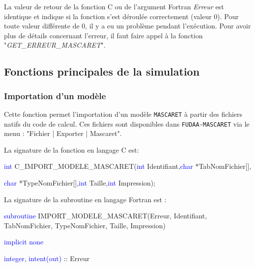 \documentclass[a4paper,11pt]{article}
\begin{document}
 \vspace{0.5cm}
 
 La valeur de retour de la fonction C ou de l'argument Fortran \textit{Erreur} est identique et indique si la fonction s'est d\'eroul\'ee correctement (valeur 0). Pour toute valeur diff\'erente de 0, il y a eu un probl\`eme pendant l'ex\'ecution. Pour avoir plus de d\'etails concernant l'erreur, il faut faire appel \`a la fonction "\textit{GET\_ERREUR\_MASCARET}".

\subsection{Fonctions principales de la simulation}

\subsubsection{Importation d'un mod\`ele}

\label{Import}

 Cette fonction permet l'importation d'un mod\`ele \texttt{MASCARET} \`a partir des fichiers natifs du code de calcul. Ces fichiers sont disponibles dans \texttt{FUDAA-MASCARET} via le menu : "Fichier | Exporter | Mascaret".
 
 \vspace{0.5cm}
 
 La signature de la fonction en langage C est:
 
 \vspace{0.5cm}
 
 \textcolor{blue}{int} C\_IMPORT\_MODELE\_MASCARET(\textcolor{blue}{int} Identifiant,\textcolor{blue}{char} *TabNomFichier[],
 
 \textcolor{blue}{char} *TypeNomFichier[],\textcolor{blue}{int} Taille,\textcolor{blue}{int} Impression);
 
 \vspace{0.5cm} 
 
 La signature de la subroutine en langage Fortran est :
 
 \vspace{0.5cm}
 
    \textcolor{blue}{subroutine} IMPORT\_MODELE\_MASCARET(Erreur, Identifiant, TabNomFichier, TypeNomFichier, Taille, Impression)
    
        \hspace{1cm}\textcolor{blue}{implicit none}                 
        
        \hspace{1cm} \textcolor{blue}{integer, intent(out)} :: Erreur
        
\end{document}
